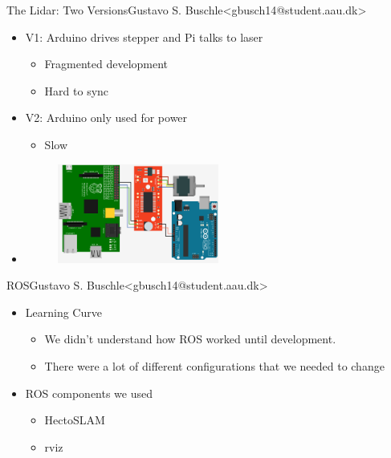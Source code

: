 \begin{frame}{The Lidar: Two Versions}{Gustavo S. Buschle\newline<gbusch14@student.aau.dk>}
    \begin{itemize}
        \item <1-> V1: Arduino drives stepper and Pi talks to laser
            \begin{itemize}
                \item <2-> Fragmented development
                \item <3-> Hard to sync
            \end{itemize}
        \item <4-> V2: Arduino only used for power 
            \begin{itemize}
                \item <5-> Slow
            \end{itemize}
        \item <4-> \begin{figure}[h!]
            \includegraphics[width=0.5\textwidth]{images/steppermotor.png}
        \end{figure}
    \end{itemize}
\end{frame}

\begin{frame}{ROS}{Gustavo S. Buschle\newline<gbusch14@student.aau.dk>}
    \begin{itemize}
        \item <1-> Learning Curve
            \begin{itemize}
                \item <1-> We didn't understand how ROS worked until development.
                \item <2-> There were a lot of different configurations that we needed to change
            \end{itemize}
        \item <3-> ROS components we used
            \begin{itemize}
                \item <4-> HectoSLAM
                \item <5-> rviz
            \end{itemize}
    \end{itemize}
\end{frame}

